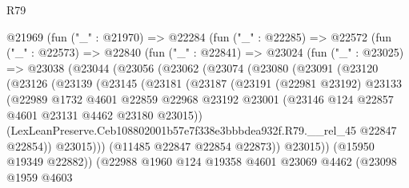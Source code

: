 \begin{lexlean}{R79}
\begin{coremodule}
        @21969
          (fun ("_" : @21970) =>
          @22284
            (fun ("_" : @22285) =>
            @22572
              (fun ("_" : @22573) =>
              @22840
                (fun ("_" : @22841) =>
                @23024
                  (fun ("_" : @23025) =>
                  @23038
                    (@23044
                      (@23056
                        (@23062
                          (@23074
                            (@23080
                              (@23091
                                (@23120
                                  (@23126
                                    (@23139
                                      (@23145
                                        (@23181
                                          (@23187
                                            (@23191
                                              (@22981 @23192)
                                              @23133
                                              (@22989
                                                @1732
                                                @4601
                                                @22859
                                                @22968
                                                @23192
                                                @23001
                                                (@23146
                                                  @124
                                                  @22857
                                                  @4601
                                                  @23131
                                                  @4462
                                                  @23180
                                                  @23015))
                                              (LexLeanPreserve.Ceb108802001b57e7f338e3bbbdea932f.R79.__rel_45
                                                @22847
                                                @22854))
                                            @23015)))
                                      (@11485 @22847 @22854 @22873))
                                    @23015))
                                (@15950 @19349 @22882))
                              (@22988
                                @1960
                                @124
                                @19358
                                @4601
                                @23069
                                @4462
                                (@23098
                                  @1959
                                  @4603

\end{coremodule}
\end{lexlean}

